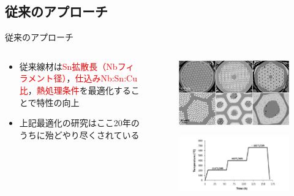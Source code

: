 \documentclass[aspectratio=169, unicode, 10pt]{beamer}
\begin{document}
	\subsection{従来のアプローチ}
	\begin{frame}{従来のアプローチ}
		\begin{columns}
			\begin{column}{0.6\linewidth}
				\begin{itemize}
					\item 従来線材は\textcolor{red}{Sn拡散長（Nbフィラメント径）}，\textcolor{red}{仕込みNb:Sn:Cu比}，\textcolor{red}{熱処理条件}を最適化することで特性の向上
					\item 上記最適化の研究はここ20年のうちに殆どやり尽くされている
				\end{itemize}	
				\vspace{5mm}
				\centering
			\end{column}	
			\begin{column}{0.4\linewidth}
				\begin{figure}
					\centering
					\includegraphics[width=\linewidth]{figs/rrpwire.png}
				\end{figure}
				\begin{figure}
					\centering
					\includegraphics[width=\linewidth]{figs/rrpheattreatment.png}
				\end{figure}
			\end{column}
		\end{columns}
	\end{frame}
\end{document}
